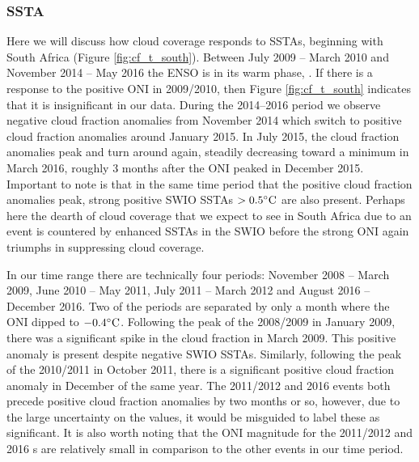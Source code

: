 

\subsubsection{SSTA}
\label{sec:disc:ssta}
Here we will discuss how cloud coverage responds to SSTAs, beginning
with South Africa (Figure \ref{fig:cf_t_south}). Between July 2009 --
March 2010 and November 2014 -- May 2016 the ENSO is in its warm phase,
\elnino{}. If there is a response to the positive ONI in 2009/2010,
then Figure \ref{fig:cf_t_south} indicates that it is insignificant in
our data. During the 2014--2016 \elnino{} period we observe negative
cloud fraction anomalies from November 2014 which switch to positive
cloud fraction anomalies around January 2015. In July 2015, the cloud
fraction anomalies peak and turn around again, steadily decreasing
toward a minimum in March 2016, roughly 3 months after the ONI peaked
in December 2015. Important to note is that in the same time period
that the positive cloud fraction anomalies peak, strong positive SWIO
SSTAs $>0.5^{\circ}\mathrm{C}$ are also present. Perhaps here the dearth of cloud
coverage that we expect to see in South Africa due to an \elnino{}
event is countered by enhanced SSTAs in the SWIO before the strong ONI
again triumphs in suppressing cloud coverage.

In our time range there are technically four \nina{} periods: November
2008 -- March 2009, June 2010 -- May 2011, July 2011 -- March 2012 and
August 2016 -- December 2016. Two of the periods are separated by only
a month where the ONI dipped to $-0.4^{\circ}\mathrm{C}$. Following the peak of the
2008/2009 \nina{} in January 2009, there was a significant spike in
the cloud fraction in March 2009.  This positive anomaly is present
despite negative SWIO SSTAs. Similarly, following the peak of the
2010/2011 \nina{} in October 2011, there is a significant positive
cloud fraction anomaly in December of the same year. The 2011/2012 and
2016 \nina{} events both precede positive cloud fraction anomalies by
two months or so, however, due to the large uncertainty on the values,
it would be misguided to label these as significant. It is also worth
noting that the ONI magnitude for the 2011/2012 and 2016 \nina s are
relatively small in comparison to the other events in our time period.

